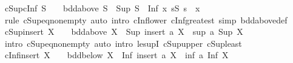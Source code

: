 \begin{isabellebody}
\endisatagproof
{\isafoldproof}%
%
\isadelimproof
\isanewline
%
\endisadelimproof
\isanewline
{}\isamarkupfalse%
\ cSup{\isacharunderscore}{\kern0pt}cInf{\isacharcolon}{\kern0pt}\ {\isachardoublequoteopen}S\ {\isasymnoteq}\ {\isacharbraceleft}{\kern0pt}{\isacharbraceright}{\kern0pt}\ {\isasymLongrightarrow}\ bdd{\isacharunderscore}{\kern0pt}above\ S\ {\isasymLongrightarrow}\ Sup\ S\ {\isacharequal}{\kern0pt}\ Inf\ {\isacharbraceleft}{\kern0pt}x{\isachardot}{\kern0pt}\ {\isasymforall}s{\isasymin}S{\isachardot}{\kern0pt}\ s\ {\isasymle}\ x{\isacharbraceright}{\kern0pt}{\isachardoublequoteclose}\isanewline
%
\isadelimproof
\ \ %
\endisadelimproof
%
\isatagproof
{}\isamarkupfalse%
\ {\isacharparenleft}{\kern0pt}rule\ cSup{\isacharunderscore}{\kern0pt}eq{\isacharunderscore}{\kern0pt}non{\isacharunderscore}{\kern0pt}empty{\isacharparenright}{\kern0pt}\ {\isacharparenleft}{\kern0pt}auto\ intro{\isacharbang}{\kern0pt}{\isacharcolon}{\kern0pt}\ cInf{\isacharunderscore}{\kern0pt}lower\ cInf{\isacharunderscore}{\kern0pt}greatest\ simp{\isacharcolon}{\kern0pt}\ bdd{\isacharunderscore}{\kern0pt}above{\isacharunderscore}{\kern0pt}def{\isacharparenright}{\kern0pt}%
\endisatagproof
{\isafoldproof}%
%
\isadelimproof
\isanewline
%
\endisadelimproof
\isanewline
{}\isamarkupfalse%
\ cSup{\isacharunderscore}{\kern0pt}insert{\isacharcolon}{\kern0pt}\ {\isachardoublequoteopen}X\ {\isasymnoteq}\ {\isacharbraceleft}{\kern0pt}{\isacharbraceright}{\kern0pt}\ {\isasymLongrightarrow}\ bdd{\isacharunderscore}{\kern0pt}above\ X\ {\isasymLongrightarrow}\ Sup\ {\isacharparenleft}{\kern0pt}insert\ a\ X{\isacharparenright}{\kern0pt}\ {\isacharequal}{\kern0pt}\ sup\ a\ {\isacharparenleft}{\kern0pt}Sup\ X{\isacharparenright}{\kern0pt}{\isachardoublequoteclose}\isanewline
%
\isadelimproof
\ \ %
\endisadelimproof
%
\isatagproof
{}\isamarkupfalse%
\ {\isacharparenleft}{\kern0pt}intro\ cSup{\isacharunderscore}{\kern0pt}eq{\isacharunderscore}{\kern0pt}non{\isacharunderscore}{\kern0pt}empty{\isacharparenright}{\kern0pt}\ {\isacharparenleft}{\kern0pt}auto\ intro{\isacharcolon}{\kern0pt}\ le{\isacharunderscore}{\kern0pt}supI{}\ cSup{\isacharunderscore}{\kern0pt}upper\ cSup{\isacharunderscore}{\kern0pt}least{\isacharparenright}{\kern0pt}%
\endisatagproof
{\isafoldproof}%
%
\isadelimproof
\isanewline
%
\endisadelimproof
\isanewline
{}\isamarkupfalse%
\ cInf{\isacharunderscore}{\kern0pt}insert{\isacharcolon}{\kern0pt}\ {\isachardoublequoteopen}X\ {\isasymnoteq}\ {\isacharbraceleft}{\kern0pt}{\isacharbraceright}{\kern0pt}\ {\isasymLongrightarrow}\ bdd{\isacharunderscore}{\kern0pt}below\ X\ {\isasymLongrightarrow}\ Inf\ {\isacharparenleft}{\kern0pt}insert\ a\ X{\isacharparenright}{\kern0pt}\ {\isacharequal}{\kern0pt}\ inf\ a\ {\isacharparenleft}{\kern0pt}Inf\ X{\isacharparenright}{\kern0pt}{\isachardoublequoteclose}\isanewline

\end{isabellebody}
